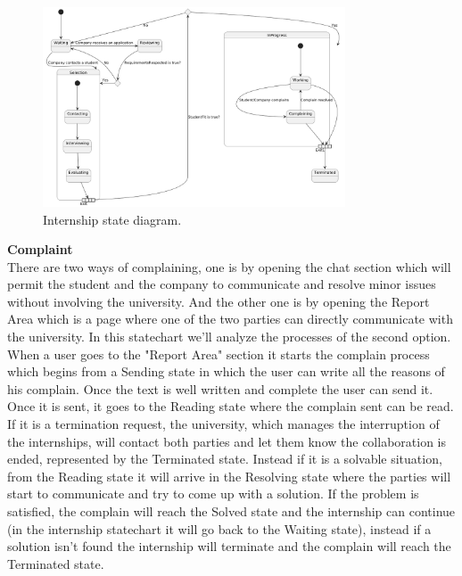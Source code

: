 \begin{figure}[H]
        \centering
        \includegraphics[width=0.8\textwidth]{Assets/Statecharts/Internship_SC.png}
        \caption{Internship state diagram.}
        \label{fig:Internship state diagram.}
    \end{figure}
\textbf{Complaint}\\
There are two ways of complaining, one is by opening the chat section which will permit the student and the company to communicate and resolve minor issues without involving the university. And the other one is by opening the Report Area which is a page where one of the two parties can directly communicate with the university. In this statechart we'll analyze the processes of the second option.
When a user goes to the "Report Area" section it starts the complain process which begins from a Sending state in which the user can write all the reasons of his complain. Once the text is well written and complete the user can send it. Once it is sent, it goes to the Reading state where the complain sent can be read. If it is a termination request, the university, which manages the interruption of the internships, will contact both parties and let them know the collaboration is ended, represented by the Terminated state. Instead if it is a solvable situation, from the Reading state it will arrive in the Resolving state where the parties will start to communicate and try to come up with a solution. If the problem is satisfied, the complain will reach the Solved state and the internship can continue (in the internship statechart it will go back to the Waiting state), instead if a solution isn't found the internship will terminate and the complain will reach the Terminated state.\\
